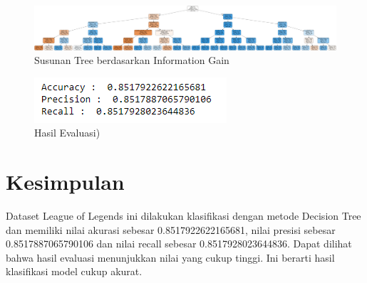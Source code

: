 \documentclass[conference]{IEEEtran}
\begin{document}
\begin{figure}
\caption{Susunan Tree berdasarkan Information Gain}
\begin{center}
\includegraphics[scale=.04]{DecisionTree.png}
\end{center}
\end{figure}

\begin{figure}
\caption{Hasil Evaluasi)}
\begin{center}
\includegraphics[scale=1]{Evaluasi.png}
\end{center}
\end{figure}

\section*{Kesimpulan}
Dataset League of Legends ini dilakukan klasifikasi dengan metode Decision Tree dan memiliki nilai akurasi sebesar 0.8517922622165681, nilai presisi sebesar 0.8517887065790106 dan nilai recall sebesar 0.8517928023644836. Dapat dilihat bahwa hasil evaluasi menunjukkan nilai yang cukup tinggi. Ini berarti hasil klasifikasi model cukup akurat.
\end{document}

